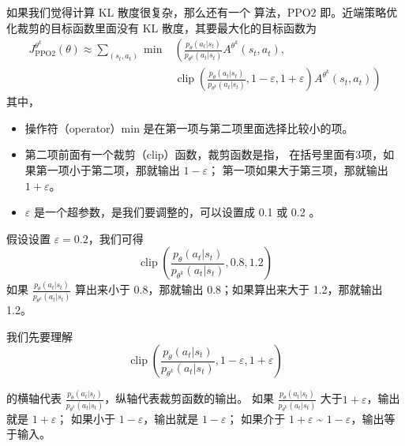如果我们觉得计算 KL 散度很复杂，那么还有一个 算法，PPO2 即。近端策略优化裁剪的目标函数里面没有 KL 散度，其要最大化的目标函数为
\begin{equation}
    \label{eq:ppo_clip}
    \begin{aligned}
        J_{\mathrm{PPO2}}^{\theta^{k}}(\theta) \approx \sum_{\left(s_{t}, a_{t}\right)} \min &\left(\frac{p_{\theta}\left(a_{t} | s_{t}\right)}{p_{\theta^{k}}\left(a_{t} | s_{t}\right)} A^{\theta^{k}}\left(s_{t}, a_{t}\right),\right.\\
        &\left.\operatorname{clip}\left(\frac{p_{\theta}\left(a_{t} | s_{t}\right)}{p_{\theta^{k}}\left(a_{t} | s_{t}\right)}, 1-\varepsilon, 1+\varepsilon\right) A^{\theta^{k}}\left(s_{t}, a_{t}\right)\right)
        \end{aligned}
\end{equation}
其中，
\begin{itemize}
    \item 操作符（operator）min 是在第一项与第二项里面选择比较小的项。
    \item 第二项前面有一个裁剪（clip）函数，裁剪函数是指，
        在括号里面有3项，如果第一项小于第二项，那就输出 $1-\varepsilon$；
        第一项如果大于第三项，那就输出 $1+\varepsilon$。 
    \item $\varepsilon$ 是一个超参数，是我们要调整的，可以设置成 0.1 或 0.2 。
\end{itemize}


假设设置 $\varepsilon=0.2$，我们可得
\begin{equation}
    \label{eq:}
    \operatorname{clip}\left(\frac{p_{\theta}\left(a_{t} | s_{t}\right)}{p_{\theta^{k}}\left(a_{t} | s_{t}\right)}, 0.8, 1.2\right)
\end{equation}
如果 $\frac{p_{\theta}\left(a_{t} | s_{t}\right)}{p_{\theta^{k}}\left(a_{t} | s_{t}\right)}$ 算出来小于 0.8，那就输出 0.8；如果算出来大于 1.2，那就输出1.2。

我们先要理解
\begin{equation}
    \label{eq:clip_function}
    \operatorname{clip}\left(\frac{p_{\theta}\left(a_{t} | s_{t}\right)}{p_{\theta^{k}}\left(a_{t} | s_{t}\right)}, 1-\varepsilon, 1+\varepsilon\right)
\end{equation}


 的横轴代表 $\frac{p_{\theta}\left(a_{t} | s_{t}\right)}{p_{\theta^{k}}\left(a_{t} | s_{t}\right)}$，纵轴代表裁剪函数的输出。
    如果 $\frac{p_{\theta}\left(a_{t} | s_{t}\right)}{p_{\theta^{k}}\left(a_{t} | s_{t}\right)}$ 大于$1+\varepsilon$，输出就是 $1+\varepsilon$；
    如果小于 $1-\varepsilon$，输出就是 $1-\varepsilon$；
    如果介于 $1+\varepsilon$ \~{} $1-\varepsilon$，输出等于输入。

